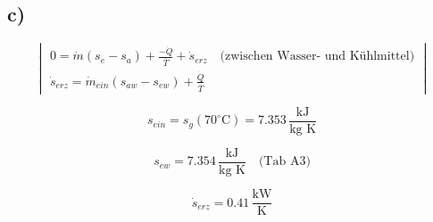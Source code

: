 

\subsection*{c)}
\[
\begin{vmatrix}
0 = \dot{m} (s_e - s_a) + \frac{-\dot{Q}}{\overline{T}} + \dot{s}_{erz} \quad \text{(zwischen Wasser- und Kühlmittel)} \\
\dot{s}_{erz} = \dot{m}_{ein} (s_{aw} - s_{ew}) + \frac{\dot{Q}}{\overline{T}}
\end{vmatrix}
\]

\[
s_{ein} = s_g (70^\circ \text{C}) = 7.353 \, \frac{\text{kJ}}{\text{kg K}}
\]

\[
s_{ew} = 7.354 \, \frac{\text{kJ}}{\text{kg K}} \quad \text{(Tab A3)}
\]

\[
\dot{s}_{erz} = 0.41 \, \frac{\text{kW}}{\text{K}}
\]